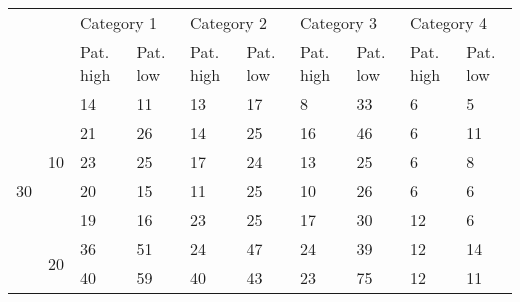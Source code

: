 \begin{table}[h]
\begin{tabular}{ll|l|l|l|l|l|l|l|l|}
\cline{3-10}
                                           &                                          & \multicolumn{2}{l|}{Category 1} & \multicolumn{2}{l|}{Category 2} & \multicolumn{2}{l|}{Category 3} & \multicolumn{2}{l|}{Category 4} \\ \cline{3-10} 
                                           &                                          & Pat. high       & Pat. low      & Pat. high       & Pat. low      & Pat. high       & Pat. low      & Pat. high       & Pat. low      \\ \hline
\multicolumn{1}{|l|}{\multirow{15}{*}{30}} & \multicolumn{1}{c|}{\multirow{5}{*}{10}} & 14              & 11            & 13              & 17            & 8               & 33            & 6               & 5             \\ \cline{3-10} 
\multicolumn{1}{|l|}{}                     & \multicolumn{1}{c|}{}                    & 21              & 26            & 14              & 25            & 16              & 46            & 6               & 11            \\ \cline{3-10} 
\multicolumn{1}{|l|}{}                     & \multicolumn{1}{c|}{}                    & 23              & 25            & 17              & 24            & 13              & 25            & 6               & 8             \\ \cline{3-10} 
\multicolumn{1}{|l|}{}                     & \multicolumn{1}{c|}{}                    & 20              & 15            & 11              & 25            & 10              & 26            & 6               & 6             \\ \cline{3-10} 
\multicolumn{1}{|l|}{}                     & \multicolumn{1}{c|}{}                    & 19              & 16            & 23              & 25            & 17              & 30            & 12              & 6             \\ \cline{2-10} 
\multicolumn{1}{|l|}{}                     & \multirow{5}{*}{20}                      & 36              & 51            & 24              & 47            & 24              & 39            & 12              & 14            \\ \cline{3-10} 
\multicolumn{1}{|l|}{}                     &                                          & 40              & 59            & 40              & 43            & 23              & 75            & 12              & 11            \\ \cline{3-10} 

\end{tabular}
\end{table}
